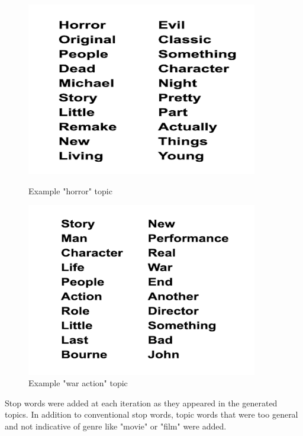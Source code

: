 \documentclass[11pt]{article}
\begin{document}
\begin{figure}[h!]
    \centering
    \begin{minipage}{0.45\textwidth}
        \centering
        \includegraphics[width=0.9\textwidth]{horrortopic}
        \caption{Example "horror" topic}
    \end{minipage}\hfill
    \begin{minipage}{0.45\textwidth}
        \centering
        \includegraphics[width=0.9\textwidth]{waractiontopic} %
        \caption{Example "war action" topic}
    \end{minipage}
\end{figure}

Stop words were added at each iteration as they appeared in the generated topics. In addition to conventional stop words,
topic words that were too general and not indicative of genre like "movie" or "film" were added. \newline
\end{document}
